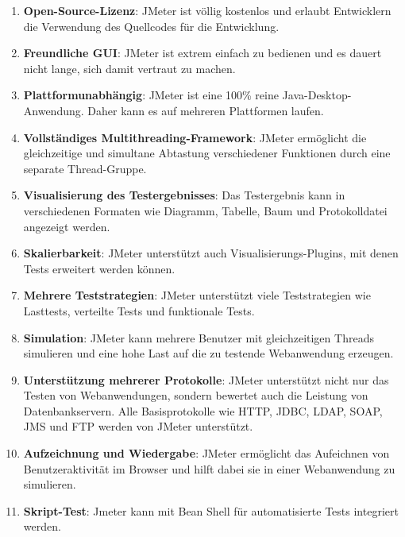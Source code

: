 \begin{enumerate}

    \item \textbf{Open-Source-Lizenz}: JMeter ist völlig kostenlos und erlaubt
     Entwicklern die Verwendung des Quellcodes für die Entwicklung.

    \item \textbf{Freundliche GUI}: JMeter ist extrem einfach zu bedienen und es
    dauert nicht lange, sich damit vertraut zu machen.

    \item \textbf{Plattformunabhängig}: JMeter ist eine 100\% reine
    Java-Desktop-Anwendung. Daher kann es auf mehreren Plattformen laufen.

    \item \textbf{Vollständiges Multithreading-Framework}: JMeter ermöglicht die
    gleichzeitige und simultane Abtastung verschiedener Funktionen durch
    eine separate Thread-Gruppe.

    \item \textbf{Visualisierung des Testergebnisses}: Das Testergebnis kann in
    verschiedenen Formaten wie Diagramm, Tabelle, Baum und Protokolldatei
    angezeigt werden.

    \item \textbf{Skalierbarkeit}: JMeter  unterstützt auch Visualisierungs-Plugins,
    mit denen Tests erweitert werden können.

    \item \textbf{Mehrere Teststrategien}: JMeter unterstützt viele
    Teststrategien wie Lasttests, verteilte Tests und funktionale Tests.

    \item \textbf{Simulation}: JMeter kann mehrere Benutzer mit gleichzeitigen Threads
    simulieren und eine hohe Last auf die zu testende Webanwendung erzeugen.

    \item \textbf{Unterstützung mehrerer Protokolle}: JMeter unterstützt nicht
    nur das Testen von Webanwendungen, sondern bewertet auch die
    Leistung von Datenbankservern. Alle Basisprotokolle wie HTTP, JDBC,
    LDAP, SOAP, JMS und FTP werden von JMeter unterstützt.

    \item \textbf{Aufzeichnung und Wiedergabe}: JMeter ermöglicht das Aufeichnen
    von Benutzeraktivität im Browser und hilft dabei sie in einer
    Webanwendung zu simulieren.

    \item \textbf{Skript-Test}: Jmeter kann mit Bean Shell für automatisierte Tests
    integriert werden.

\end{enumerate}

